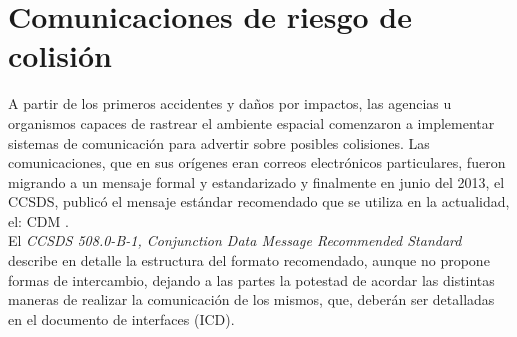 % 
% 
% 
% 
% 



\section{Comunicaciones de riesgo de colisi\'on}{\label{sec:anuncio}}


A partir de los primeros accidentes y da\~nos por impactos, las agencias u organismos capaces de rastrear el ambiente espacial comenzaron a implementar sistemas de comunicaci\'on para advertir sobre posibles colisiones. Las comunicaciones, que en sus or\'igenes eran correos electr\'onicos particulares, fueron migrando a un mensaje formal y estandarizado y finalmente en junio del 2013, el \ac{CCSDS}, public\'o el mensaje est\'andar recomendado que se utiliza en la actualidad, el: \ac{CDM} \citep{CDM}.\\

El {\it{CCSDS 508.0-B-1, Conjunction Data Message Recommended Standard}} describe en detalle la estructura del formato recomendado, aunque no propone formas de intercambio, dejando a las partes la potestad de acordar las distintas maneras de realizar la comunicaci\'on de los mismos, que, deber\'an ser detalladas en el documento de interfaces (ICD).\\

